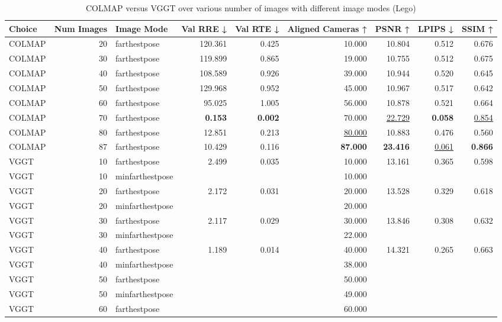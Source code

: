 \begin{table}[H]
\caption{COLMAP versus VGGT over various number of images with different image modes (Lego)}
\label{tab:01_num_images_image_mode_lego}
\centering
\scriptsize
\begin{tabular}{lrlrrrrrr}
\toprule
Choice & Num Images & Image Mode & Val RRE ↓ & Val RTE ↓ & Aligned Cameras ↑ & PSNR ↑ & LPIPS ↓ & SSIM ↑ \\
\midrule
COLMAP & 20 & farthestpose & 120.361 & 0.425 & 10.000 & 10.804 & 0.512 & 0.676 \\
COLMAP & 30 & farthestpose & 119.899 & 0.865 & 19.000 & 10.755 & 0.512 & 0.675 \\
COLMAP & 40 & farthestpose & 108.589 & 0.926 & 39.000 & 10.944 & 0.520 & 0.645 \\
COLMAP & 50 & farthestpose & 129.968 & 0.952 & 45.000 & 10.967 & 0.517 & 0.642 \\
COLMAP & 60 & farthestpose & 95.025 & 1.005 & 56.000 & 10.878 & 0.521 & 0.664 \\
COLMAP & 70 & farthestpose & \textbf{0.153} & \textbf{0.002} & 70.000 & \underline{22.729} & \textbf{0.058} & \underline{0.854} \\
COLMAP & 80 & farthestpose & 12.851 & 0.213 & \underline{80.000} & 10.883 & 0.476 & 0.560 \\
COLMAP & 87 & farthestpose & 10.429 & 0.116 & \textbf{87.000} & \textbf{23.416} & \underline{0.061} & \textbf{0.866} \\
VGGT & 10 & farthestpose & 2.499 & 0.035 & 10.000 & 13.161 & 0.365 & 0.598 \\
VGGT & 10 & minfarthestpose &  &  & 10.000 &  &  &  \\
VGGT & 20 & farthestpose & 2.172 & 0.031 & 20.000 & 13.528 & 0.329 & 0.618 \\
VGGT & 20 & minfarthestpose &  &  & 20.000 &  &  &  \\
VGGT & 30 & farthestpose & 2.117 & 0.029 & 30.000 & 13.846 & 0.308 & 0.632 \\
VGGT & 30 & minfarthestpose &  &  & 22.000 &  &  &  \\
VGGT & 40 & farthestpose & 1.189 & 0.014 & 40.000 & 14.321 & 0.265 & 0.663 \\
VGGT & 40 & minfarthestpose &  &  & 38.000 &  &  &  \\
VGGT & 50 & farthestpose &  &  & 50.000 &  &  &  \\
VGGT & 50 & minfarthestpose &  &  & 49.000 &  &  &  \\
VGGT & 60 & farthestpose &  &  & 60.000 &  &  &  \\

\end{tabular}
\end{table}

